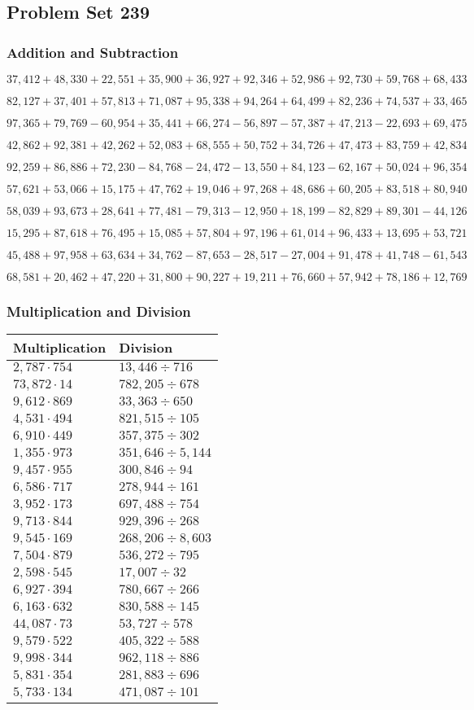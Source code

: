 \hypertarget{problem-set-239}{%
\subsection{Problem Set 239}\label{problem-set-239}}

\hypertarget{addition-and-subtraction}{%
\subsubsection{Addition and
Subtraction}\label{addition-and-subtraction}}

\(37,412+48,330+22,551+35,900+36,927+92,346+52,986+92,730+59,768+68,433\)

\(82,127+37,401+57,813+71,087+95,338+94,264+64,499+82,236+74,537+33,465\)

\(97,365+79,769-60,954+35,441+66,274-56,897-57,387+47,213-22,693+69,475\)

\(42,862+92,381+42,262+52,083+68,555+50,752+34,726+47,473+83,759+42,834\)

\(92,259+86,886+72,230-84,768-24,472-13,550+84,123-62,167+50,024+96,354\)

\(57,621+53,066+15,175+47,762+19,046+97,268+48,686+60,205+83,518+80,940\)

\(58,039+93,673+28,641+77,481-79,313-12,950+18,199-82,829+89,301-44,126\)

\(15,295+87,618+76,495+15,085+57,804+97,196+61,014+96,433+13,695+53,721\)

\(45,488+97,958+63,634+34,762-87,653-28,517-27,004+91,478+41,748-61,543\)

\(68,581+20,462+47,220+31,800+90,227+19,211+76,660+57,942+78,186+12,769\)

\hypertarget{multiplication-and-division}{%
\subsubsection{Multiplication and
Division}\label{multiplication-and-division}}

\begin{longtable}[]{@{}ll@{}}
\toprule
Multiplication & Division\tabularnewline
\midrule
\endhead
\(2,787\cdot754\) & \(13,446 ÷716\)\tabularnewline
\(73,872\cdot14\) & \(782,205÷678\)\tabularnewline
\(9,612\cdot869\) & \(33,363÷650\)\tabularnewline
\(4,531\cdot494\) & \(821,515÷105\)\tabularnewline
\(6,910\cdot449\) & \(357,375÷302\)\tabularnewline
\(1,355\cdot973\) & \(351,646÷5,144\)\tabularnewline
\(9,457\cdot955\) & \(300,846÷94\)\tabularnewline
\(6,586\cdot717\) & \(278,944÷161\)\tabularnewline
\(3,952\cdot173\) & \(697,488÷754\)\tabularnewline
\(9,713\cdot844\) & \(929,396÷268\)\tabularnewline
\(9,545\cdot169\) & \(268,206÷8,603\)\tabularnewline
\(7,504\cdot879\) & \(536,272÷795\)\tabularnewline
\(2,598\cdot545\) & \(17,007÷32\)\tabularnewline
\(6,927\cdot394\) & \(780,667÷266\)\tabularnewline
\(6,163\cdot632\) & \(830,588÷145\)\tabularnewline
\(44,087\cdot73\) & \(53,727÷578\)\tabularnewline
\(9,579\cdot522\) & \(405,322÷588\)\tabularnewline
\(9,998\cdot344\) & \(962,118÷886\)\tabularnewline
\(5,831\cdot354\) & \(281,883÷696\)\tabularnewline
\(5,733\cdot134\) & \(471,087÷101\)\tabularnewline
\bottomrule
\end{longtable}
